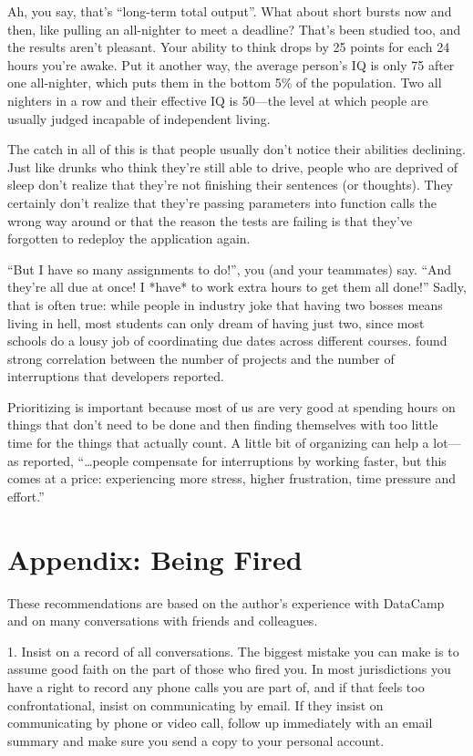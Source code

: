 \documentclass[10pt,letterpaper]{article}
\begin{document}
Ah, you say, that's ``long-term total output''.  What about short bursts
now and then, like pulling an all-nighter to meet a deadline?  That's
been studied too, and the results aren't pleasant.  Your ability to
think drops by 25 points for each 24 hours you're awake.  Put it
another way, the average person's IQ is only 75 after one all-nighter,
which puts them in the bottom 5\% of the population.  Two all nighters
in a row and their effective IQ is 50---the level at which people are
usually judged incapable of independent living.

The catch in all of this is that people usually don't notice their
abilities declining.  Just like drunks who think they're still able to
drive, people who are deprived of sleep don't realize that they're not
finishing their sentences (or thoughts).  They certainly don't realize
that they're passing parameters into function calls the wrong way
around or that the reason the tests are failing is that they've
forgotten to redeploy the application again.

``But I have so many assignments to do!'', you (and your teammates) say.
``And they're all due at once!  I *have* to work extra hours to get
them all done!'' Sadly, that is often true: while people in industry
joke that having two bosses means living in hell, most students can
only dream of having just two, since most schools do a lousy job of
coordinating due dates across different courses.  \cite{Tregubov2017}
found strong correlation between the number of projects and the number
of interruptions that developers reported.

Prioritizing is important because most of us are very good at spending
hours on things that don't need to be done and then finding themselves
with too little time for the things that actually count. A little bit
of organizing can help a lot---as \cite{Mark2008} reported,
``{\ldots}people compensate for interruptions by working faster, but
this comes at a price: experiencing more stress, higher frustration,
time pressure and effort.''

\section*{Appendix: Being Fired}

These recommendations are based on the author's experience with DataCamp \cite{Alba2019}
and on many conversations with friends and colleagues.

1. Insist on a record of all conversations.
   The biggest mistake you can make is to assume good faith on the part of those
   who fired you.  In most jurisdictions you have a right to record any phone calls
   you are part of, and if that feels too confrontational, insist on communicating
   by email.  If they insist on communicating by phone or video call, follow up
   immediately with an email summary and make sure you send a copy to your personal
   account.
\end{document}
